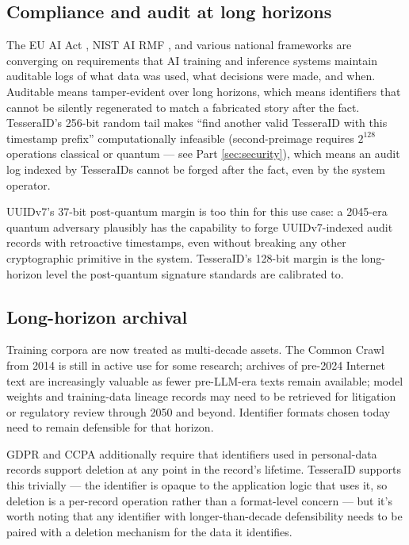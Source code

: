 \subsection{Compliance and audit at long horizons}

The EU AI Act \citep{euaiact}, NIST AI RMF \citep{nistairmf}, and various national frameworks are converging on requirements that AI training and inference systems maintain auditable logs of what data was used, what decisions were made, and when. Auditable means tamper-evident over long horizons, which means identifiers that cannot be silently regenerated to match a fabricated story after the fact. TesseraID's 256-bit random tail makes ``find another valid TesseraID with this timestamp prefix'' computationally infeasible (second-preimage requires $2^{128}$ operations classical or quantum --- see Part \ref{sec:security}), which means an audit log indexed by TesseraIDs cannot be forged after the fact, even by the system operator.

UUIDv7's 37-bit post-quantum margin is too thin for this use case: a 2045-era quantum adversary plausibly has the capability to forge UUIDv7-indexed audit records with retroactive timestamps, even without breaking any other cryptographic primitive in the system. TesseraID's 128-bit margin is the long-horizon level the post-quantum signature standards are calibrated to.

\subsection{Long-horizon archival}

Training corpora are now treated as multi-decade assets. The Common Crawl \citep{commoncrawl} from 2014 is still in active use for some research; archives of pre-2024 Internet text are increasingly valuable as fewer pre-LLM-era texts remain available; model weights and training-data lineage records may need to be retrieved for litigation or regulatory review through 2050 and beyond. Identifier formats chosen today need to remain defensible for that horizon.

GDPR \citep{gdpr} and CCPA \citep{ccpa} additionally require that identifiers used in personal-data records support deletion at any point in the record's lifetime. TesseraID supports this trivially --- the identifier is opaque to the application logic that uses it, so deletion is a per-record operation rather than a format-level concern --- but it's worth noting that any identifier with longer-than-decade defensibility needs to be paired with a deletion mechanism for the data it identifies.

